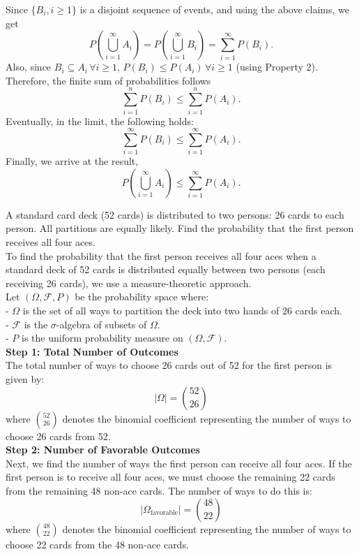 Since \( \{B_i, i \geq 1\} \) is a disjoint sequence of events, and using the above claims, we get
\[
P\left(\bigcup_{i=1}^{\infty} A_i\right) = P\left(\bigcup_{i=1}^{\infty} B_i\right) = \sum_{i=1}^{\infty} P(B_i).
\]
Also, since \( B_i \subseteq A_i \, \forall i \geq 1 \), \( P(B_i) \leq P(A_i) \, \forall i \geq 1 \) (using Property 2). Therefore, the finite sum of probabilities follows
\[
\sum_{i=1}^{n} P(B_i) \leq \sum_{i=1}^{n} P(A_i).
\]
Eventually, in the limit, the following holds:
\[
\sum_{i=1}^{\infty} P(B_i) \leq \sum_{i=1}^{\infty} P(A_i).
\]
Finally, we arrive at the result,
\[
P\left(\bigcup_{i=1}^{\infty} A_i\right) \leq \sum_{i=1}^{\infty} P(A_i).
\]

\begin{example}
    A standard card deck (52 cards) is distributed to two persons: 26 cards to each person. All partitions are equally likely. Find the probability that the first person receives all four aces.\\

    To find the probability that the first person receives all four aces when a standard deck of 52 cards is distributed equally between two persons (each receiving 26 cards), we use a measure-theoretic approach.\\

Let \((\Omega, \mathcal{F}, P)\) be the probability space where:\\
- \(\Omega\) is the set of all ways to partition the deck into two hands of 26 cards each.\\
- \(\mathcal{F}\) is the \(\sigma\)-algebra of subsets of \(\Omega\).\\
- \(P\) is the uniform probability measure on \((\Omega, \mathcal{F})\).\\

\textbf{Step 1: Total Number of Outcomes}\\

The total number of ways to choose 26 cards out of 52 for the first person is given by:
\[
|\Omega| = \binom{52}{26}
\]
where \(\binom{52}{26}\) denotes the binomial coefficient representing the number of ways to choose 26 cards from 52.\\

\textbf{Step 2: Number of Favorable Outcomes}\\

Next, we find the number of ways the first person can receive all four aces. If the first person is to receive all four aces, we must choose the remaining 22 cards from the remaining 48 non-ace cards. The number of ways to do this is:
\[
|\Omega_{\text{favorable}}| = \binom{48}{22}
\]
where \(\binom{48}{22}\) denotes the binomial coefficient representing the number of ways to choose 22 cards from the 48 non-ace cards.\\


\end{example}
